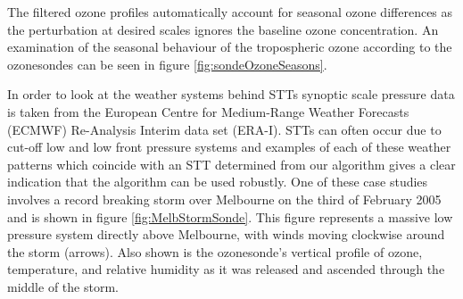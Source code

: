 The filtered ozone profiles automatically account for seasonal ozone differences as the perturbation at desired scales ignores the baseline ozone concentration.
An examination of the seasonal behaviour of the tropospheric ozone according to the ozonesondes can be seen in figure \ref{fig:sondeOzoneSeasons}.

In order to look at the weather systems behind STTs synoptic scale pressure data is taken from the European Centre for Medium-Range Weather Forecasts (ECMWF) Re-Analysis Interim data set (ERA-I).
STTs can often occur due to cut-off low and low front pressure systems and examples of each of these weather patterns which coincide with an STT determined from our algorithm gives a clear indication that the algorithm can be used robustly.
One of these case studies involves a record breaking storm over Melbourne on the third of February 2005 and is shown in figure \ref{fig:MelbStormSonde}.
This figure represents a massive low pressure system directly above Melbourne, with winds moving clockwise around the storm (arrows).
Also shown is the ozonesonde's vertical profile of ozone, temperature, and relative humidity as it was released and ascended through the middle of the storm.
